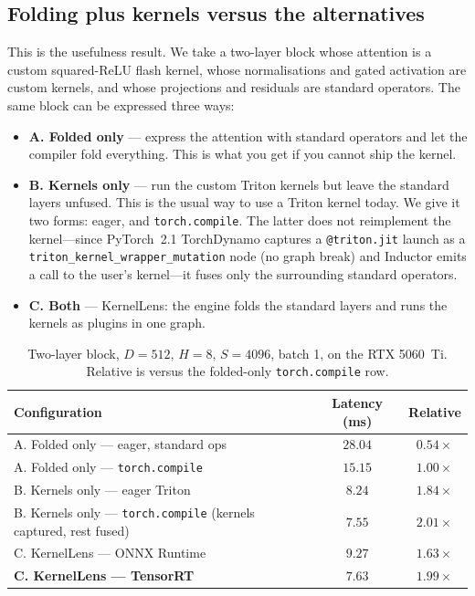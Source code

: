 \documentclass[11pt,a4paper]{article}
\begin{document}
\subsection{Folding plus kernels versus the alternatives}
\label{sec:folding}

This is the usefulness result. We take a two-layer block whose attention is a
custom squared-ReLU flash kernel, whose normalisations and gated activation are
custom kernels, and whose projections and residuals are standard operators. The
same block can be expressed three ways:

\begin{itemize}[leftmargin=1.5em]
    \item \textbf{A. Folded only} --- express the attention with standard
    operators and let the compiler fold everything. This is what you get if you
    cannot ship the kernel.
    \item \textbf{B. Kernels only} --- run the custom Triton kernels but leave the
    standard layers unfused. This is the usual way to use a Triton kernel today.
    We give it two forms: eager, and \texttt{torch.compile}. The latter does not
    reimplement the kernel---since PyTorch~2.1 TorchDynamo captures a
    \texttt{@triton.jit} launch as a \texttt{triton\_kernel\_wrapper\_mutation}
    node (no graph break) and Inductor emits a call to the user's kernel---it
    fuses only the surrounding standard operators.
    \item \textbf{C. Both} --- KernelLens: the engine folds the standard layers
    and runs the kernels as plugins in one graph.
\end{itemize}

\begin{table}[h!]
\centering
\small
\begin{tabular}{lc c}
\toprule
\textbf{Configuration} & \textbf{Latency (ms)} & \textbf{Relative} \\ \midrule
A. Folded only --- eager, standard ops & $28.04$ & $0.54\times$ \\
A. Folded only --- \texttt{torch.compile} & $15.15$ & $1.00\times$ \\ \midrule
B. Kernels only --- eager Triton & $8.24$ & $1.84\times$ \\
B. Kernels only --- \texttt{torch.compile} (kernels captured, rest fused) & $7.55$ & $2.01\times$ \\ \midrule
C. KernelLens --- ONNX Runtime & $9.27$ & $1.63\times$ \\
\textbf{C. KernelLens --- TensorRT} & $\mathbf{7.63}$ & $\mathbf{1.99\times}$ \\
\bottomrule
\end{tabular}
\caption{Two-layer block, $D{=}512$, $H{=}8$, $S{=}4096$, batch 1, on the RTX
5060~Ti. Relative is versus the folded-only \texttt{torch.compile} row.}
\label{tab:folding}
\end{table}
\end{document}
